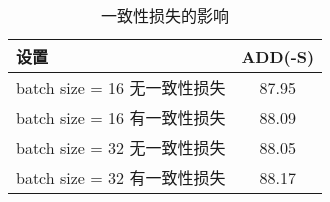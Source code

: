 \begin{table}
    \centering
    \caption{一致性损失的影响}
    \begin{tabular}{lc}
    \toprule 
    设置 & ADD(-S) \\
    \midrule
    batch size = 16 无一致性损失 & 87.95 \\
    batch size = 16 有一致性损失 & 88.09 \\
    \midrule
    batch size = 32 无一致性损失 & 88.05 \\
    batch size = 32 有一致性损失 & 88.17 \\
    \bottomrule
  \end{tabular}
  \label{tab:consistent_loss}
\end{table}